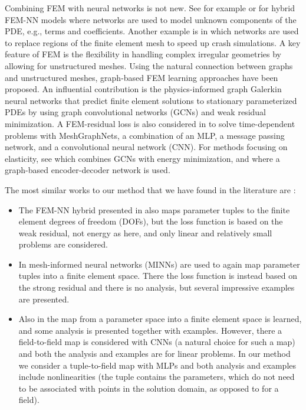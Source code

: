 \documentclass[12pt]{article}
\begin{document}
Combining FEM with neural networks is not new. See for example \cite{Guan2023, Bergel_2023, ABALLAY2026114447} or \cite{MITUSCH2021110651} for hybrid FEM-NN models where networks are used to model unknown components of the PDE, e.g., terms and coefficients. Another example is \cite{THEL2024117073} in which networks are used to replace regions of the finite element mesh to speed up crash simulations. A key feature of FEM is the flexibility in handling complex irregular geometries by allowing for unstructured meshes. Using the natural connection between graphs and unstructured meshes, graph-based FEM learning approaches have been proposed. An influential contribution is the physics-informed graph Galerkin neural networks \cite{GAO2022114502} that predict finite element solutions to stationary parameterized PDEs by using graph convolutional networks (GCNs) and weak residual minimization. A FEM-residual loss is also considered in \cite{WURTH2024117102} to solve time-dependent problems with MeshGraphNets, a combination of an MLP, a message passing network, and a convolutional neural network (CNN). For methods focusing on elasticity, see \cite{He2023} which combines GCNs with energy minimization, and \cite{DESHPANDE2024108055} where a graph-based encoder-decoder network is used.

The most similar works to our method that we have found in the literature are \cite{Meethal2023, MR4645137, khara_neufenet_2024}:

\begin{itemize}
\item The FEM-NN hybrid presented in \cite{Meethal2023} also maps parameter tuples to the finite element degrees of freedom (DOFs), but the loss function is based on the weak residual, not energy as here, and only linear and relatively small problems are considered.

\item In \cite{MR4645137} mesh-informed neural networks (MINNs) are used to again map parameter tuples into a finite element space. There the loss function is instead based on the strong residual and there is no analysis, but several impressive examples are presented.

\item Also in \cite{khara_neufenet_2024} the map from a parameter space into a finite element space is learned, and some analysis is presented together with examples. However, there a field-to-field map is considered with CNNs (a natural choice for such a map) and both the analysis and examples are for linear problems. In our method we consider a tuple-to-field map with MLPs and both analysis and examples include nonlinearities (the tuple contains the parameters, which do not need to be associated with points in the solution domain, as opposed to for a field).
\end{itemize}
\end{document}
